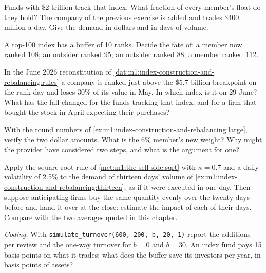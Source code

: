 \begin{exercise}[$\star$]\label{exo:m1:index-construction-and-rebalancing:2}
Funds with \$2 trillion track that index. What fraction of every member's
float do they hold? The company of the previous exercise is added and trades
\$400 million a day. Give the demand in dollars and in days of volume.
\end{exercise}

\begin{exercise}[$\star$]\label{exo:m1:index-construction-and-rebalancing:3}
A top-100 index has a buffer of 10 ranks. Decide the fate of: a member now
ranked 108; an outsider ranked 95; an outsider ranked 88; a member ranked 112.
\end{exercise}

\begin{exercise}[$\star\star$]\label{exo:m1:index-construction-and-rebalancing:4}
In the June 2026 reconstitution of
\cref{dat:m1:index-construction-and-rebalancing:rules} a company is ranked
just above the \$5.7 billion breakpoint on the rank day and loses 30\% of its
value in May. In which index is it on 29 June? What has the fall changed for
the funds tracking that index, and for a firm that bought the stock in April
expecting their purchases?
\end{exercise}

\begin{exercise}[$\star\star$]\label{exo:m1:index-construction-and-rebalancing:5}
With the round numbers of
\cref{ex:m1:index-construction-and-rebalancing:large}, verify the two dollar
amounts. What is the 6\% member's new weight? Why might the provider have
considered two steps, and what is the argument for one?
\end{exercise}

\begin{exercise}[$\star\star$]\label{exo:m1:index-construction-and-rebalancing:6}
Apply the square-root rule of \cref{met:m1:the-sell-side:sqrt} with
$\kappa = 0.7$ and a daily volatility of 2.5\% to the demand of thirteen
days' volume of \cref{ex:m1:index-construction-and-rebalancing:thirteen}, as
if it were executed in one day. Then suppose anticipating firms buy the same
quantity evenly over the twenty days before and hand it over at the close:
estimate the impact of each of their days. Compare with the two averages
quoted in this chapter.
\end{exercise}

\begin{exercise}[$\star\star\star$]\label{exo:m1:index-construction-and-rebalancing:7}
\emph{Coding.} With \texttt{simulate\_turnover(600, 200, b, 20, 1)} report
the additions per review and the one-way turnover for $b = 0$ and $b = 30$.
An index fund pays 15 basis points on what it trades; what does the buffer
save its investors per year, in basis points of assets?
\end{exercise}


